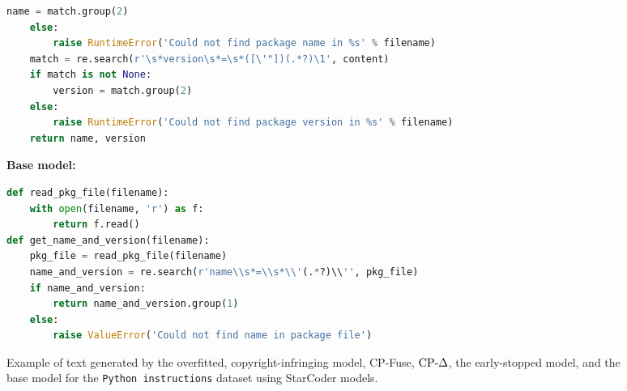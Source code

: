 \begin{figure}[!htbp]
\begin{promptmdftwo}
\begin{lstlisting}[style=mystyle, language=Python]
        name = match.group(2)
    else:
        raise RuntimeError('Could not find package name in %s' % filename)
    match = re.search(r'\s*version\s*=\s*([\'"])(.*?)\1', content)
    if match is not None:
        version = match.group(2)
    else:
        raise RuntimeError('Could not find package version in %s' % filename)
    return name, version
        \end{lstlisting}
        \textbf{Base model:}
        \begin{lstlisting}[style=mystyle, language=Python]
def read_pkg_file(filename):    
    with open(filename, 'r') as f:
        return f.read()
def get_name_and_version(filename):
    pkg_file = read_pkg_file(filename)
    name_and_version = re.search(r'name\\s*=\\s*\\'(.*?)\\'', pkg_file)
    if name_and_version:
        return name_and_version.group(1)
    else:        
        raise ValueError('Could not find name in package file')
        \end{lstlisting}
    \end{promptmdftwo}
    \caption{Example of text generated by the overfitted, copyright-infringing model, CP-Fuse, $\text{CP-}\Delta$, the early-stopped model, and the base model for the \texttt{Python instructions} dataset using StarCoder  models.}
    \label{fig:example2_code_methods}
\end{figure}



